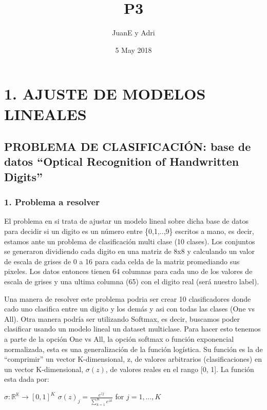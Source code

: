 \documentclass[]{article}
\title{P3}
\author{JuanE y Adri}
\date{5 May 2018}
\begin{document}
\maketitle

\section{1. AJUSTE DE MODELOS
LINEALES}\label{ajuste-de-modelos-lineales}

\subsection{\texorpdfstring{PROBLEMA DE CLASIFICACIÓN: base de datos
``Optical Recognition of Handwritten
Digits''}{PROBLEMA DE CLASIFICACIÓN: base de datos Optical Recognition of Handwritten Digits}}\label{problema-de-clasificacion-base-de-datos-optical-recognition-of-handwritten-digits}

\subsubsection{1. Problema a resolver}\label{problema-a-resolver}

El problema en si trata de ajustar un modelo lineal sobre dicha base de
datos para decidir si un digito es un número entre \{0,1,..,9\} escritos
a mano, es decir, estamos ante un problema de clasificación multi clase
(10 clases). Los conjuntos se generaron dividiendo cada digito en una
matriz de 8x8 y calculando un valor de escala de grises de 0 a 16 para
cada celda de la matriz promediando sus pixeles. Los datos entonces
tienen 64 columnas para cada uno de los valores de escala de grises y
una ultima columna (65) con el digito real (será nuestro label).

Una manera de resolver este problema podria ser crear 10 clasificadores
donde cado uno clasifica entre un digito y los demás y asi con todas las
clases (One vs All). Otra manera podría ser utilizando Softmax, es
decir, buscamos poder clasificar usando un modelo lineal un dataset
multiclase. Para hacer esto tenemos a parte de la opción One vs All, la
opción softmax o función exponencial normalizada, esta es una
generalización de la función logística. Su función es la de
``comprimir'' un vector K-dimensional, z, de valores arbitrarios
(clasificaciones) en un vector K-dimensional, \(\sigma(z)\), de valores
reales en el rango {[}0, 1{]}. La función esta dada por:

\(\sigma:\mathbb{R^{K}\rightarrow}\left[0,1\right]^{K}\)
\(\sigma(z)_{j}=\frac{e^{zj}}{\sum_{k=1}^{K}e^{zk}}\) for \(j=1, ...,K\)
\end{document}
